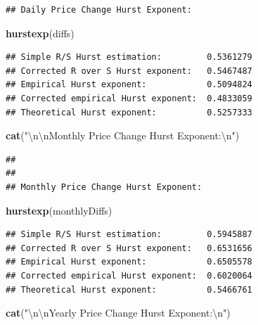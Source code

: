 \documentclass[]{article}
\newenvironment{Shaded}{\begin{snugshade}}{\end{snugshade}}
\newcommand{\CharTok}[1]{\textcolor[rgb]{0.31,0.60,0.02}{#1}}
\newcommand{\KeywordTok}[1]{\textcolor[rgb]{0.13,0.29,0.53}{\textbf{#1}}}
\newcommand{\NormalTok}[1]{#1}
\newcommand{\StringTok}[1]{\textcolor[rgb]{0.31,0.60,0.02}{#1}}
\begin{document}
\begin{verbatim}
## Daily Price Change Hurst Exponent:
\end{verbatim}

\begin{Shaded}
\begin{Highlighting}[]
\KeywordTok{hurstexp}\NormalTok{(diffs)}
\end{Highlighting}
\end{Shaded}

\begin{verbatim}
## Simple R/S Hurst estimation:         0.5361279 
## Corrected R over S Hurst exponent:   0.5467487 
## Empirical Hurst exponent:            0.5094824 
## Corrected empirical Hurst exponent:  0.4833059 
## Theoretical Hurst exponent:          0.5257333
\end{verbatim}

\begin{Shaded}
\begin{Highlighting}[]
\KeywordTok{cat}\NormalTok{(}\StringTok{"}\CharTok{\textbackslash{}n\textbackslash{}n}\StringTok{Monthly Price Change Hurst Exponent:}\CharTok{\textbackslash{}n}\StringTok{"}\NormalTok{)}
\end{Highlighting}
\end{Shaded}

\begin{verbatim}
## 
## 
## Monthly Price Change Hurst Exponent:
\end{verbatim}

\begin{Shaded}
\begin{Highlighting}[]
\KeywordTok{hurstexp}\NormalTok{(monthlyDiffs)}
\end{Highlighting}
\end{Shaded}

\begin{verbatim}
## Simple R/S Hurst estimation:         0.5945887 
## Corrected R over S Hurst exponent:   0.6531656 
## Empirical Hurst exponent:            0.6505578 
## Corrected empirical Hurst exponent:  0.6020064 
## Theoretical Hurst exponent:          0.5466761
\end{verbatim}

\begin{Shaded}
\begin{Highlighting}[]
\KeywordTok{cat}\NormalTok{(}\StringTok{"}\CharTok{\textbackslash{}n\textbackslash{}n}\StringTok{Yearly Price Change Hurst Exponent:}\CharTok{\textbackslash{}n}\StringTok{"}\NormalTok{)}
\end{Highlighting}
\end{Shaded}
\end{document}
